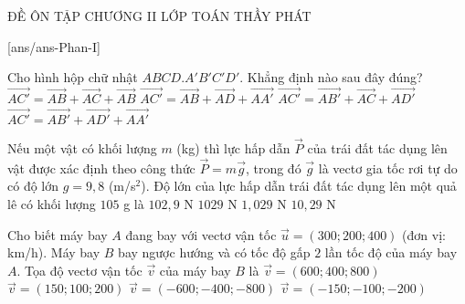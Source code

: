 ﻿\begin{name}
	{\tenchude}
	{ĐỀ ÔN TẬP CHƯƠNG II}
	{LỚP TOÁN THẦY PHÁT}
	{\thoigian}
\end{name}

\TN
{}[ans/ans\currfilebase-Phan-I]
\begin{ex}%
 Cho hình hộp chữ nhật $ABCD.A'B'C'D'$. Khẳng định nào sau đây đúng?
 \choice
 {$\overrightarrow{AC'}=\overrightarrow{AB}+\overrightarrow{AC}+\overrightarrow{AB}$}
 {\True $\overrightarrow{AC'}=\overrightarrow{AB}+\overrightarrow{AD}+\overrightarrow{AA'}$}
 {$\overrightarrow{AC'}=\overrightarrow{AB'}+\overrightarrow{AC}+\overrightarrow{AD'}$}
 {$\overrightarrow{AC'}=\overrightarrow{AB'}+\overrightarrow{AD'}+\overrightarrow{AA'}$}
\end{ex}

\begin{ex}%
 Nếu một vật có khối lượng $m$ (kg) thì lực hấp dẫn $\overrightarrow{P}$ của trái đất tác dụng lên vật được xác định theo công thức $\overrightarrow P=m\overrightarrow g$, trong đó $\overrightarrow g$ là vectơ gia tốc rơi tự do có độ lớn $g=9{,}8$ (m/s$^2$). Độ lớn của lực hấp dẫn trái đất tác dụng lên một quả lê có khối lượng $105$ g là
 \choice
 {$102{,}9$ N}
 {$1029$ N}
 {\True $1{,}029$ N}
 {$10{,}29$ N}
\end{ex}

\begin{ex}%
 Cho biết máy bay $A$ đang bay với vectơ vận tốc $\overrightarrow u=( 300;200;400)$ (đơn vị: km/h). Máy bay $B$ bay ngược hướng và có tốc độ gấp $2$ lần tốc độ của máy bay $A$. Tọa độ vectơ vận tốc $\overrightarrow v$ của máy bay $B$ là
 \choice
 {$\overrightarrow v=(600;400;800)$}
 {$\overrightarrow v=(150;100;200)$}
 {\True $\overrightarrow v=(-600;-400;-800)$}
 {$\overrightarrow v=(-150;-100;-200)$}
 \end{ex}

